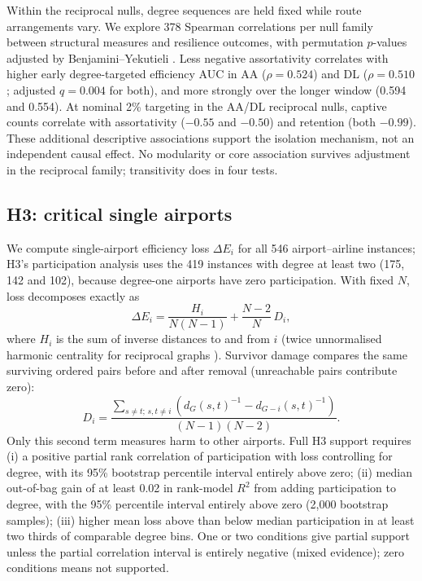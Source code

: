 \documentclass[12pt, a4paper]{article}
\begin{document}
Within the reciprocal nulls, degree sequences are held fixed while route arrangements vary. We explore 378 Spearman correlations per null family between structural measures and resilience outcomes, with permutation $p$-values adjusted by Benjamini--Yekutieli \cite{by2001}. Less negative assortativity correlates with higher early degree-targeted efficiency AUC in AA ($\rho=0.524$) and DL ($\rho=0.510$; adjusted $q=0.004$ for both), and more strongly over the longer window (0.594 and 0.554). At nominal 2\% targeting in the AA/DL reciprocal nulls, captive counts correlate with assortativity ($-0.55$ and $-0.50$) and retention (both $-0.99$). These additional descriptive associations support the isolation mechanism, not an independent causal effect. No modularity or core association survives adjustment in the reciprocal family; transitivity does in four tests.

\subsection{H3: critical single airports}

We compute single-airport efficiency loss $\Delta E_i$ for all 546 airport--airline instances; H3's participation analysis uses the 419 instances with degree at least two (175, 142 and 102), because degree-one airports have zero participation. With fixed $N$, loss decomposes exactly as
\begin{equation}
\Delta E_i = \frac{H_i}{N(N-1)} + \frac{N-2}{N}\,D_i,
\end{equation}
where $H_i$ is the sum of inverse distances to and from $i$ (twice unnormalised harmonic centrality for reciprocal graphs \cite{boldi2014}). Survivor damage compares the same surviving ordered pairs before and after removal (unreachable pairs contribute zero):
\begin{equation*}
D_i=\frac{\sum_{s\ne t;\,s,t\ne i}(d_G(s,t)^{-1}-d_{G-i}(s,t)^{-1})}{(N-1)(N-2)}.
\end{equation*}
Only this second term measures harm to other airports. Full H3 support requires (i) a positive partial rank correlation of participation with loss controlling for degree, with its 95\% bootstrap percentile interval entirely above zero; (ii) median out-of-bag gain of at least 0.02 in rank-model $R^2$ from adding participation to degree, with the 95\% percentile interval entirely above zero (2,000 bootstrap samples); (iii) higher mean loss above than below median participation in at least two thirds of comparable degree bins. One or two conditions give partial support unless the partial correlation interval is entirely negative (mixed evidence); zero conditions means not supported.
\end{document}
